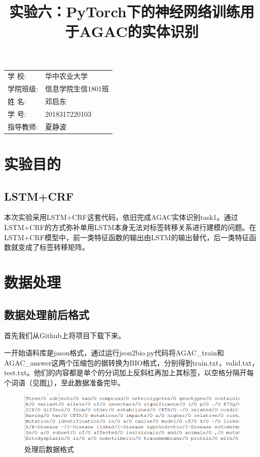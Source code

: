 \documentclass[12pt]{article}
\title{\heiti 实验六：PyTorch下的神经网络训练用于AGAC的实体识别}
\begin{document}
	\maketitle
	
	\vspace{5cm}
	
	\begin{table}[h]
		\centering
		\begin{Large}
			\begin{tabular}{p{3cm} p{7cm}<{\centering}}
				学  \qquad  校: &  华中农业大学     \\ \cline{2-2}
				学院班级:      & 信息学院生信1801班   \\ \cline{2-2}
				姓  \qquad  名: & 邓启东 \\ \cline{2-2}
				学  \qquad  号: & 2018317220103 \\ \cline{2-2}
				指导教师:       &夏静波 \\ \cline{2-2}
			\end{tabular}
		\end{Large}		
	\end{table}
	
	\newpage%

	\tableofcontents
	
	\newpage
	\section{实验目的}
\subsection{LSTM+CRF}
本次实验采用LSTM+CRF这套代码，依旧完成AGAC实体识别task1。通过LSTM+CRF的方式弥补单用LSTM本身无法对标签转移关系进行建模的问题。在LSTM+CRF模型中，前一类特征函数的输出由LSTM的输出替代，后一类特征函数就变成了标签转移矩阵。
\section{数据处理}
\subsection{数据处理前后格式}
首先我们从Github上将项目下载下来。\par
一开始语料库是jason格式，通过运行json2bio.py代码将AGAC\_train和AGAC\_answer这两个压缩包的据转换为BIO格式，分别得到train.txt，valid.txt，test.txt。他们的内容都是单个的分词加上反斜杠再加上其标签，以空格分隔开每个词语（见图\ref{sdasad}），至此数据准备完毕。\par
\begin{figure}[H]
  \centering
  \includegraphics[scale=0.4]{./picture/data.png} %
  \caption{处理后数据格式} %
  \label{sdasad} %
\end{figure}
\end{document}
